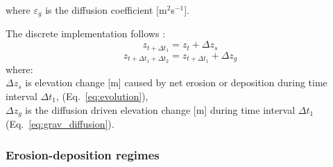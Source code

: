 \documentclass[gmd, manuscript]{copernicus}
\begin{document}
\noindent
where $\varepsilon_g$ is the diffusion coefficient [\unit{m}$^2$\unit{s}$^{-1}$].

\noindent
The discrete implementation follows \citet{Thaxton2004}:
\begin{equation}
\label{eq:evolution_disc1} 
z_{t+ \Delta t_1} = z_t + \Delta z_s  
\end{equation}
\begin{equation}
\label{eq:evolution_disc2} 
z_{t+\Delta t_1+\Delta t_2} = z_{t+\Delta t_1} + \Delta z_g 
\end{equation}
{\small
where: \\
\noindent
\hspace*{0.5em} $\Delta z_s$ is elevation change [\unit{m}] caused by net erosion or deposition during time interval $\Delta t_1$,
(Eq.~\ref{eq:evolution}),\\
\hspace*{0.5em} $\Delta z_g$ is the diffusion driven elevation change [\unit{m}] during time interval $\Delta t_1$ 
(Eq.~\ref{eq:grav_diffusion}).\\
}

\subsubsection{Erosion-deposition regimes}
\end{document}
